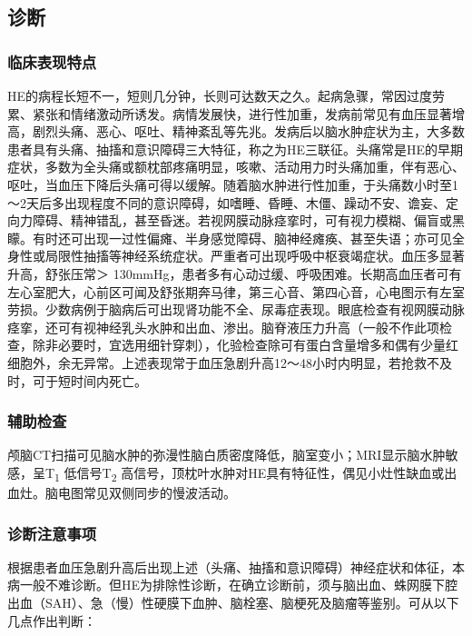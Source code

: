 \subsection{诊断}

\subsubsection{临床表现特点}

HE的病程长短不一，短则几分钟，长则可达数天之久。起病急骤，常因过度劳累、紧张和情绪激动所诱发。病情发展快，进行性加重，发病前常见有血压显著增高，剧烈头痛、恶心、呕吐、精神紊乱等先兆。发病后以脑水肿症状为主，大多数患者具有头痛、抽搐和意识障碍三大特征，称之为HE三联征。头痛常是HE的早期症状，多数为全头痛或额枕部疼痛明显，咳嗽、活动用力时头痛加重，伴有恶心、呕吐，当血压下降后头痛可得以缓解。随着脑水肿进行性加重，于头痛数小时至1～2天后多出现程度不同的意识障碍，如嗜睡、昏睡、木僵、躁动不安、谵妄、定向力障碍、精神错乱，甚至昏迷。若视网膜动脉痉挛时，可有视力模糊、偏盲或黑矇。有时还可出现一过性偏瘫、半身感觉障碍、脑神经瘫痪、甚至失语；亦可见全身性或局限性抽搐等神经系统症状。严重者可出现呼吸中枢衰竭症状。血压多显著升高，舒张压常＞
130mmHg，患者多有心动过缓、呼吸困难。长期高血压者可有左心室肥大，心前区可闻及舒张期奔马律，第三心音、第四心音，心电图示有左室劳损。少数病例于脑病后可出现肾功能不全、尿毒症表现。眼底检查有视网膜动脉痉挛，还可有视神经乳头水肿和出血、渗出。脑脊液压力升高（一般不作此项检查，除非必要时，宜选用细针穿刺），化验检查除可有蛋白含量增多和偶有少量红细胞外，余无异常。上述表现常于血压急剧升高12～48小时内明显，若抢救不及时，可于短时间内死亡。

\subsubsection{辅助检查}

颅脑CT扫描可见脑水肿的弥漫性脑白质密度降低，脑室变小；MRI显示脑水肿敏感，呈T\textsubscript{1}
低信号T\textsubscript{2}
高信号，顶枕叶水肿对HE具有特征性，偶见小灶性缺血或出血灶。脑电图常见双侧同步的慢波活动。

\subsubsection{诊断注意事项}

根据患者血压急剧升高后出现上述（头痛、抽搐和意识障碍）神经症状和体征，本病一般不难诊断。但HE为排除性诊断，在确立诊断前，须与脑出血、蛛网膜下腔出血（SAH）、急（慢）性硬膜下血肿、脑栓塞、脑梗死及脑瘤等鉴别。可从以下几点作出判断：

